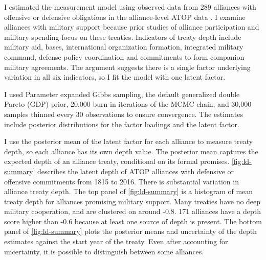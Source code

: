 \documentclass[12pt]{article}
\begin{document}
I estimated the measurement model using observed data from 289 alliances with offensive or defensive obligations in the alliance-level ATOP data \citep{Leedsetal2002}. 
I examine alliances with military support because prior studies of alliance participation and military spending focus on these treaties.
Indicators of treaty depth include military aid, bases, international organization formation, integrated military command, defense policy coordination and commitments to form companion military agreements. 
The argument suggests there is a single factor underlying variation in all six indicators, so I fit the model with one latent factor. 


I used Parameter expanded Gibbs sampling, the default generalized double Pareto (GDP) prior, 20,000 burn-in iterations of the MCMC chain, and 30,000 samples thinned every 30 observations to ensure convergence. 
The estimates include posterior distributions for the factor loadings and the latent factor. 


I use the posterior mean of the latent factor for each alliance to measure treaty depth, so each alliance has its own depth value.
The posterior mean captures the expected depth of an alliance treaty, conditional on its formal promises. 
\autoref{fig:ld-summary} describes the latent depth of ATOP alliances with defensive or offensive commitments from 1815 to 2016.
There is substantial variation in alliance treaty depth. 
The top panel of \autoref{fig:ld-summary} is a histogram of mean treaty depth for alliances promising military support.  
Many treaties have no deep military cooperation, and are clustered on around -0.8.  
171 alliances have a depth score higher than -0.6 because at least one source of depth is present. 
The bottom panel of \autoref{fig:ld-summary} plots the posterior means and uncertainty of the depth estimates against the start year of the treaty. 
Even after accounting for uncertainty, it is possible to distinguish between some alliances. 
\end{document}
